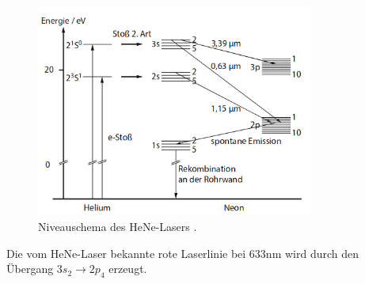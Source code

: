 \begin{figure}[H]
  \centering
  \includegraphics[height=7cm]{Entladung.png}
  \caption{Niveauschema des HeNe-Lasers \cite{Springer2}.}
  \label{fig:entladung}
\end{figure}

Die vom HeNe-Laser bekannte rote Laserlinie bei 633\;nm wird durch den Übergang $3s_2 \rightarrow 2p_4$
erzeugt.
